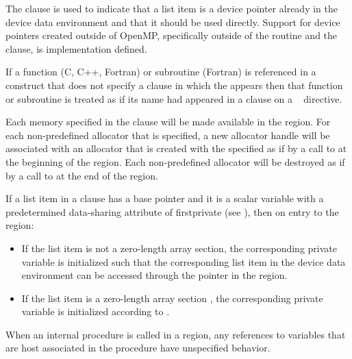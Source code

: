 The  clause is used to indicate that a list item is a device
pointer already in the device data environment and that it should be used
directly.  Support for device pointers created outside of OpenMP, specifically
outside of the  routine and the  clause,
is implementation defined.

If a function (C, C++, Fortran) or subroutine (Fortran) is referenced in a
 construct that does not specify a  clause in which the
  appears then that function or subroutine
is treated as if its name had appeared in a  clause on a
~ directive.

Each memory  specified in the  clause will 
be made available in the  region. For each non-predefined allocator 
that is specified, a new allocator handle will be associated with an allocator 
that is created with the specified  as if by a call to 
 at the beginning of the  region. Each 
non-predefined allocator will be destroyed as if by a call to 
 at the end of the  region.

\begin{ccppspecific}

If a list item in a  clause has a base pointer and it is a
scalar variable with a predetermined data-sharing attribute of firstprivate
(see ), then on entry 
to the  region:

\begin{itemize}
\item If the list item is not a zero-length array section, the corresponding
private variable is initialized such that the corresponding list item in the
device data environment can be accessed through the pointer in the
 region.

\item If the list item is a zero-length array section , the corresponding
private variable is initialized according to  .
\end{itemize}

\end{ccppspecific}

\begin{fortranspecific}
When an internal procedure is called in a  region, any
references to variables that are host associated in the procedure have
unspecified behavior.
\end{fortranspecific}

